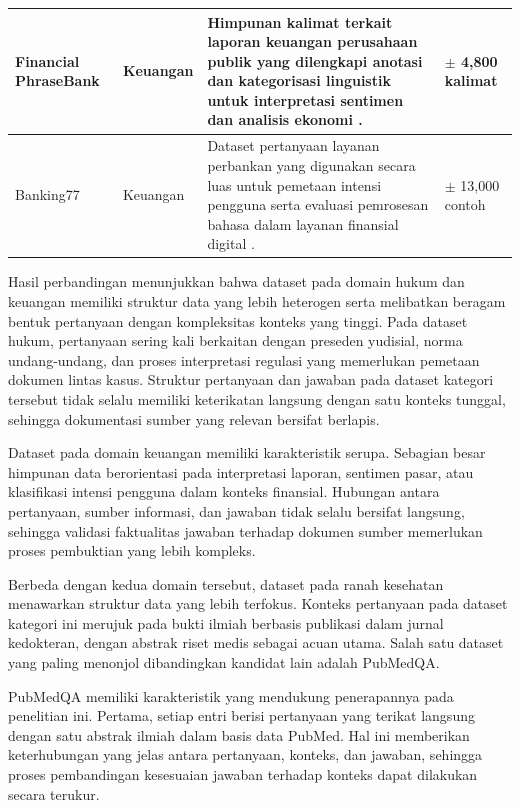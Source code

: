 \begin{longtable}{|p{2.2cm}|p{1.5cm}|p{5cm}|p{2.8cm}|}
Financial PhraseBank &
Keuangan &
Himpunan kalimat terkait laporan keuangan perusahaan publik yang dilengkapi anotasi dan kategorisasi linguistik untuk interpretasi sentimen dan analisis ekonomi \parencite{phrasebank}. &
$\pm$ 4{,}800 kalimat
\\ \hline

Banking77 &
Keuangan &
Dataset pertanyaan layanan perbankan yang digunakan secara luas untuk pemetaan intensi pengguna serta evaluasi pemrosesan bahasa dalam layanan finansial digital \parencite{banking77}. &
$\pm$ 13{,}000 contoh
\\ \hline

\end{longtable}

Hasil perbandingan menunjukkan bahwa dataset pada domain hukum dan keuangan memiliki struktur data yang lebih heterogen serta melibatkan beragam bentuk pertanyaan dengan kompleksitas konteks yang tinggi. Pada dataset hukum, pertanyaan sering kali berkaitan dengan preseden yudisial, norma undang-undang, dan proses interpretasi regulasi yang memerlukan pemetaan dokumen lintas kasus. Struktur pertanyaan dan jawaban pada dataset kategori tersebut tidak selalu memiliki keterikatan langsung dengan satu konteks tunggal, sehingga dokumentasi sumber yang relevan bersifat berlapis.

Dataset pada domain keuangan memiliki karakteristik serupa. Sebagian besar himpunan data berorientasi pada interpretasi laporan, sentimen pasar, atau klasifikasi intensi pengguna dalam konteks finansial. Hubungan antara pertanyaan, sumber informasi, dan jawaban tidak selalu bersifat langsung, sehingga validasi faktualitas jawaban terhadap dokumen sumber memerlukan proses pembuktian yang lebih kompleks.

Berbeda dengan kedua domain tersebut, dataset pada ranah kesehatan menawarkan struktur data yang lebih terfokus. Konteks pertanyaan pada dataset kategori ini merujuk pada bukti ilmiah berbasis publikasi dalam jurnal kedokteran, dengan abstrak riset medis sebagai acuan utama. Salah satu dataset yang paling menonjol dibandingkan kandidat lain adalah PubMedQA.

PubMedQA memiliki karakteristik yang mendukung penerapannya pada penelitian ini. Pertama, setiap entri berisi pertanyaan yang terikat langsung dengan satu abstrak ilmiah dalam basis data PubMed. Hal ini memberikan keterhubungan yang jelas antara pertanyaan, konteks, dan jawaban, sehingga proses pembandingan kesesuaian jawaban terhadap konteks dapat dilakukan secara terukur.

